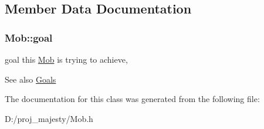 \subsection{Member Data Documentation}
\subsubsection[{\texorpdfstring{goal}{goal}}]{ Mob\+::goal\hspace{0.3cm}{\ttfamily [protected]}}\hypertarget{class_mob_ad6c2e1b70a39551fd39b25002dac55b1}{}\label{class_mob_ad6c2e1b70a39551fd39b25002dac55b1}


goal this \hyperlink{class_mob}{Mob} is trying to achieve, 

\begin{DoxySeeAlso}{See also}
\hyperlink{class_mob_a886346a9f913203df0797f2c84dd8962}{Goals} 
\end{DoxySeeAlso}


The documentation for this class was generated from the following file\+:\begin{DoxyCompactItemize}
\item 
D\+:/proj\+\_\+majesty/Mob.\+h\end{DoxyCompactItemize}
